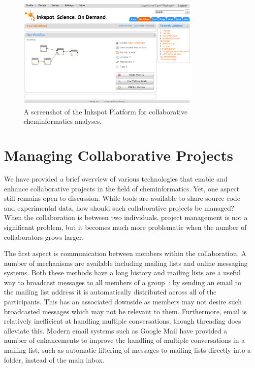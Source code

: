 \documentclass[11pt]{book}
\begin{document}
\begin{figure}[bt]
\begin{center}
\includegraphics[width=0.8\textwidth]{graphics/inkspot.png}
\end{center}
\caption{A screenshot of the Inkspot Platform for collaborative
cheminformatics analyses.}
\label{fig:inkspot}
\end{figure}


\section{Managing Collaborative Projects}

We have provided a brief overview of various technologies that enable
and enhance collaborative projects in the field of
cheminformatics. Yet, one aspect still remains open to discussion. While tools are
available to share source code and experimental data, how should such
collaborative projects be managed? When the collaboration is between two
individuals, project management is not a significant problem, but it
becomes much more problematic when the number of collaborators grows
larger.

The first aspect is communication between members within the
collaboration. A number of mechanisms are available including mailing
lists and online messaging systems. Both these methods have a long
history and mailing lists are a useful way to broadcast messages to
all members of a group~\cite{wp:mailinglist}:
by sending an email to the mailing list address
it is automatically distributed across all of the participants.
This has an associated downside as members
may not desire such broadcasted messages which may not be
relevant to them. Furthermore, email is
relatively inefficient at handling multiple conversations, though
threading does alleviate this. Modern email systems such as
Google Mail have provided a number of enhancements to improve the
handling of multiple conversations in a mailing list, such as
automatic filtering of messages to mailing lists directly into
a folder, instead of the main inbox.
\end{document}
